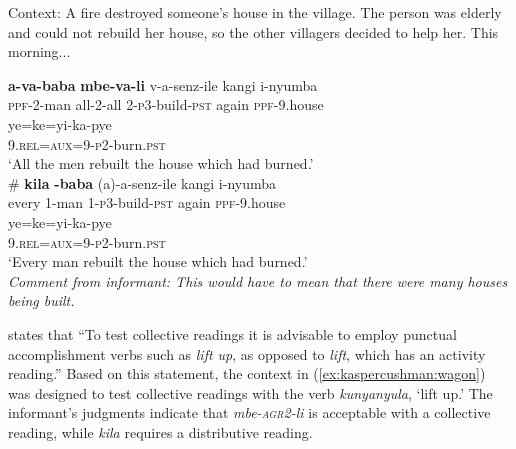 \documentclass[output=paper,modfonts,nonflat]{langsci/langscibook}
\begin{document}
\begin{exe}

 \ex Context: A fire destroyed someone's house in the village. The person was elderly and could not rebuild her house, so the other villagers decided to help her. This morning...  \\

\begin{xlist}

\ex 
\gll \textbf{a-va-baba} \textbf{mbe-va-li} v-a-senz-ile kangi i-nyumba \\
\textsc{ppf}-2-man all-2-all 2-\textsc{p3}-build-\textsc{pst} again \textsc{ppf}-9.house\\


\gll ye=ke=yi-ka-pye  \\ 
 9.\textsc{rel}=\textsc{aux}=9-\textsc{p2}-burn.\textsc{pst} \\
\glt `All the men rebuilt the house which had burned.' \\



\ex 
\gll \# \textbf{kila} \textbf{-baba} (a)-a-senz-ile kangi i-nyumba \\
{} every 1-man 1-\textsc{p3}-build-\textsc{pst} again \textsc{ppf}-9.house \\


\gll ye=ke=yi-ka-pye   \\ 
9.\textsc{rel}=\textsc{aux}=9-\textsc{p2}-burn.\textsc{pst}\\
\glt `Every man rebuilt the house which had burned.' \\ 
\textit{Comment from informant: This would have to mean that there were many houses being built.}

\end{xlist}
\end{exe}


\citealt[121]{szabolcsi10} states that ``To test collective readings it is advisable to employ punctual accomplishment verbs such as \textit{lift up}, as opposed to \emph{lift}, which has an activity reading.'' Based on this statement, the context in (\ref{ex:kaspercushman:wagon}) was designed to test collective readings with the verb \textit{kunyanyula}, `lift up.' The informant's judgments indicate that  \textit{mbe-\textsc{agr2}-li} is acceptable with a collective reading, while \textit{kila} requires a distributive reading. 
\end{document}
